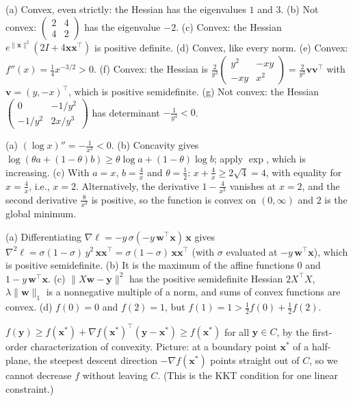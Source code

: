 \documentclass[11pt]{article}
\newcommand{\norm}[1]{\lVert #1 \rVert}
\begin{document}
\begin{description}[leftmargin=0pt, itemsep=0.3em]
    \item[\ref{pr:convex-which}.] (a) Convex, even strictly: the Hessian has the eigenvalues $1$ and $3$. (b) Not convex: $\begin{pmatrix} 2 & 4 \\ 4 & 2 \end{pmatrix}$ has the eigenvalue $-2$. (c) Convex: the Hessian $e^{\norm{\mathbf{x}}^2}(2I + 4\mathbf{x}\mathbf{x}^\top)$ is positive definite. (d) Convex, like every norm. (e) Convex: $f''(x) = \frac{1}{4}x^{-3/2} > 0$. (f) Convex: the Hessian is $\frac{2}{y^3}\begin{pmatrix} y^2 & -xy \\ -xy & x^2 \end{pmatrix} = \frac{2}{y^3}\mathbf{v}\mathbf{v}^\top$ with $\mathbf{v} = (y, -x)^\top$, which is positive semidefinite. (g) Not convex: the Hessian $\begin{pmatrix} 0 & -1/y^2 \\ -1/y^2 & 2x/y^3 \end{pmatrix}$ has determinant $-\frac{1}{y^4} < 0$.
    \item[\ref{pr:am-gm}.] (a) $(\log x)'' = -\frac{1}{x^2} < 0$. (b) Concavity gives $\log(\theta a + (1 - \theta)b) \geq \theta\log a + (1 - \theta)\log b$; apply $\exp$, which is increasing. (c) With $a = x$, $b = \frac{4}{x}$ and $\theta = \frac{1}{2}$: $x + \frac{4}{x} \geq 2\sqrt{4} = 4$, with equality for $x = \frac{4}{x}$, i.e., $x = 2$. Alternatively, the derivative $1 - \frac{4}{x^2}$ vanishes at $x = 2$, and the second derivative $\frac{8}{x^3}$ is positive, so the function is convex on $(0, \infty)$ and $2$ is the global minimum.
    \item[\ref{pr:convex-losses}.] (a) Differentiating $\nabla\ell = -y\,\sigma(-y\,\mathbf{w}^\top\mathbf{x})\,\mathbf{x}$ gives $\nabla^2\ell = \sigma(1 - \sigma)\,y^2\,\mathbf{x}\mathbf{x}^\top = \sigma(1 - \sigma)\,\mathbf{x}\mathbf{x}^\top$ (with $\sigma$ evaluated at $-y\,\mathbf{w}^\top\mathbf{x}$), which is positive semidefinite. (b) It is the maximum of the affine functions $0$ and $1 - y\,\mathbf{w}^\top\mathbf{x}$. (c) $\norm{X\mathbf{w} - \mathbf{y}}^2$ has the positive semidefinite Hessian $2X^\top X$, $\lambda\norm{\mathbf{w}}_1$ is a nonnegative multiple of a norm, and sums of convex functions are convex. (d) $f(0) = 0$ and $f(2) = 1$, but $f(1) = 1 > \frac{1}{2}f(0) + \frac{1}{2}f(2)$.
    \item[\ref{pr:first-order-optimality}.] $f(\mathbf{y}) \geq f(\mathbf{x}^*) + \nabla f(\mathbf{x}^*)^\top(\mathbf{y} - \mathbf{x}^*) \geq f(\mathbf{x}^*)$ for all $\mathbf{y} \in C$, by the first-order characterization of convexity. Picture: at a boundary point $\mathbf{x}^*$ of a half-plane, the steepest descent direction $-\nabla f(\mathbf{x}^*)$ points straight out of $C$, so we cannot decrease $f$ without leaving $C$. (This is the KKT condition for one linear constraint.)

\end{description}
\end{document}
